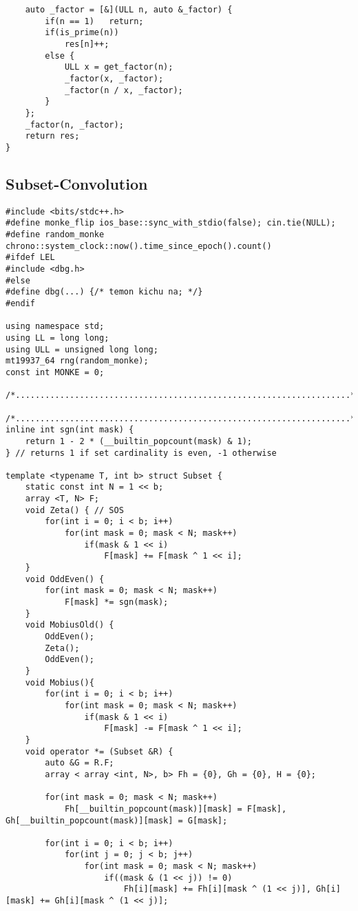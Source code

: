 \documentclass[FSZ,a4paper,onesided]{article}
\begin{document}
\begin{multicols*}{\COLS}
\begin{lstlisting}
    auto _factor = [&](ULL n, auto &_factor) {
        if(n == 1)   return;
        if(is_prime(n)) 
            res[n]++;
        else {
            ULL x = get_factor(n);
            _factor(x, _factor);
            _factor(n / x, _factor);
        }
    };
    _factor(n, _factor);
    return res;
}
\end{lstlisting}
\subsection{Subset-Convolution}
\begin{lstlisting}
#include <bits/stdc++.h>
#define monke_flip ios_base::sync_with_stdio(false); cin.tie(NULL);
#define random_monke chrono::system_clock::now().time_since_epoch().count()
#ifdef LEL
#include <dbg.h>
#else
#define dbg(...) {/* temon kichu na; */}
#endif

using namespace std;
using LL = long long;
using ULL = unsigned long long;
mt19937_64 rng(random_monke);
const int MONKE = 0;

/*....................................................................*/ 

/*....................................................................*/ 
inline int sgn(int mask) {
    return 1 - 2 * (__builtin_popcount(mask) & 1);
} // returns 1 if set cardinality is even, -1 otherwise

template <typename T, int b> struct Subset {
    static const int N = 1 << b;
    array <T, N> F;
    void Zeta() { // SOS
        for(int i = 0; i < b; i++)
            for(int mask = 0; mask < N; mask++)
                if(mask & 1 << i)
                    F[mask] += F[mask ^ 1 << i];
    }
    void OddEven() {
        for(int mask = 0; mask < N; mask++)
            F[mask] *= sgn(mask);
    }
    void MobiusOld() {
        OddEven();
        Zeta();
        OddEven();
    }
    void Mobius(){
        for(int i = 0; i < b; i++)
            for(int mask = 0; mask < N; mask++)
                if(mask & 1 << i)
                    F[mask] -= F[mask ^ 1 << i];
    }
    void operator *= (Subset &R) {
        auto &G = R.F;
        array < array <int, N>, b> Fh = {0}, Gh = {0}, H = {0};

        for(int mask = 0; mask < N; mask++) 
            Fh[__builtin_popcount(mask)][mask] = F[mask], Gh[__builtin_popcount(mask)][mask] = G[mask];

        for(int i = 0; i < b; i++)
            for(int j = 0; j < b; j++)
                for(int mask = 0; mask < N; mask++)
                    if((mask & (1 << j)) != 0)
                        Fh[i][mask] += Fh[i][mask ^ (1 << j)], Gh[i][mask] += Gh[i][mask ^ (1 << j)];
                    

\end{lstlisting}
\end{multicols*}
\end{document}
